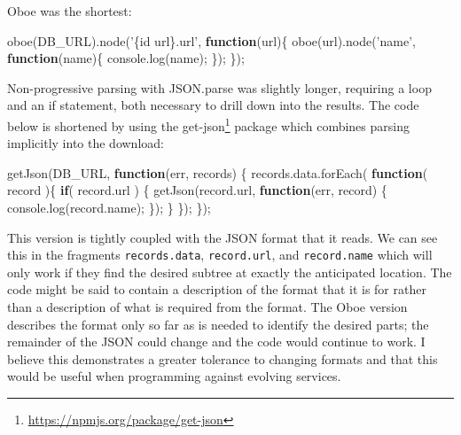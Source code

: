 \documentclass[12pt, ]{article}
\newenvironment{Shaded}{}{}
\newcommand{\KeywordTok}[1]{\textcolor[rgb]{0.00,0.44,0.13}{\textbf{{#1}}}}
\newcommand{\StringTok}[1]{\textcolor[rgb]{0.25,0.44,0.63}{{#1}}}
\newcommand{\OtherTok}[1]{\textcolor[rgb]{0.00,0.44,0.13}{{#1}}}
\newcommand{\FunctionTok}[1]{\textcolor[rgb]{0.02,0.16,0.49}{{#1}}}
\newcommand{\NormalTok}[1]{{#1}}
\begin{document}
Oboe was the shortest:

\begin{Shaded}
\begin{Highlighting}[]
\FunctionTok{oboe}\NormalTok{(DB_URL).}\FunctionTok{node}\NormalTok{(}\StringTok{'\{id url\}.url'}\NormalTok{, }\KeywordTok{function}\NormalTok{(url)\{}
   \FunctionTok{oboe}\NormalTok{(url).}\FunctionTok{node}\NormalTok{(}\StringTok{'name'}\NormalTok{, }\KeywordTok{function}\NormalTok{(name)\{}
      \OtherTok{console}\NormalTok{.}\FunctionTok{log}\NormalTok{(name);               }
   \NormalTok{\});      }
\NormalTok{\});}
\end{Highlighting}
\end{Shaded}

Non-progressive parsing with JSON.parse was slightly longer, requiring a
loop and an if statement, both necessary to drill down into the results.
The code below is shortened by using the get-json\footnote{\url{https://npmjs.org/package/get-json}}
package which combines parsing implicitly into the download:

\begin{Shaded}
\begin{Highlighting}[]
\FunctionTok{getJson}\NormalTok{(DB_URL, }\KeywordTok{function}\NormalTok{(err, records) \{}
   \OtherTok{records}\NormalTok{.}\OtherTok{data}\NormalTok{.}\FunctionTok{forEach}\NormalTok{( }\KeywordTok{function}\NormalTok{( record )\{}
      \KeywordTok{if}\NormalTok{( }\OtherTok{record}\NormalTok{.}\FunctionTok{url} \NormalTok{) \{}
         \FunctionTok{getJson}\NormalTok{(}\OtherTok{record}\NormalTok{.}\FunctionTok{url}\NormalTok{, }\KeywordTok{function}\NormalTok{(err, record) \{}
            \OtherTok{console}\NormalTok{.}\FunctionTok{log}\NormalTok{(}\OtherTok{record}\NormalTok{.}\FunctionTok{name}\NormalTok{);}
         \NormalTok{\});}
      \NormalTok{\}}
   \NormalTok{\});}
\NormalTok{\});}
\end{Highlighting}
\end{Shaded}

This version is tightly coupled with the JSON format that it reads. We
can see this in the fragments \texttt{records.data},
\texttt{record.url}, and \texttt{record.name} which will only work if
they find the desired subtree at exactly the anticipated location. The
code might be said to contain a description of the format that it is for
rather than a description of what is required from the format. The Oboe
version describes the format only so far as is needed to identify the
desired parts; the remainder of the JSON could change and the code would
continue to work. I believe this demonstrates a greater tolerance to
changing formats and that this would be useful when programming against
evolving services.
\end{document}
